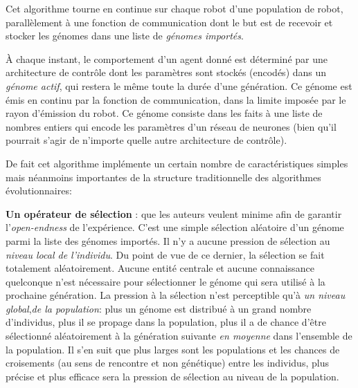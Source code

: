 Cet algorithme tourne en continue sur chaque robot d'une population de robot, parallèlement à une fonction de communication dont le but est de recevoir et stocker les génomes dans une liste de \emph{génomes importés}.

À chaque instant, le comportement d'un agent donné est déterminé par une architecture de contrôle dont les paramètres sont stockés (encodés) dans un \emph{génome actif}, qui restera le même toute la durée d'une génération. Ce génome est émis en continu par la fonction de communication, dans la limite imposée par le rayon d'émission du robot. Ce génome consiste dans les faits à une liste de nombres entiers qui encode les paramètres d'un réseau de neurones (bien qu'il pourrait s'agir de n'importe quelle autre architecture de contrôle).

De fait cet algorithme implémente un certain nombre de caractéristiques simples mais néanmoins importantes de la structure traditionnelle des algorithmes évolutionnaires:

\textbf{Un opérateur de sélection }: que les auteurs veulent minime afin de garantir l'\emph{open-endness} de l'expérience. C'est une simple sélection aléatoire d'un génome parmi la liste des génomes importés. Il n'y a aucune pression de sélection au \emph{niveau local de l'individu}. Du point de vue de ce dernier, la sélection se fait totalement aléatoirement. Aucune entité centrale et aucune connaissance quelconque n'est nécessaire pour sélectionner le génome qui sera utilisé à la prochaine génération. La pression à la sélection n'est perceptible qu'à \emph{un niveau global},\emph{de la population}: plus un génome est distribué à un grand nombre d'individus, plus il se propage dans la population, plus il a de chance d'être sélectionné aléatoirement à la génération suivante \emph{en moyenne} dans l'ensemble de la population. Il s'en suit que plus larges sont les populations et les chances de croisements (au sens de rencontre et non génétique) entre les individus, plus précise et plus efficace sera la pression de sélection au niveau de la population.

